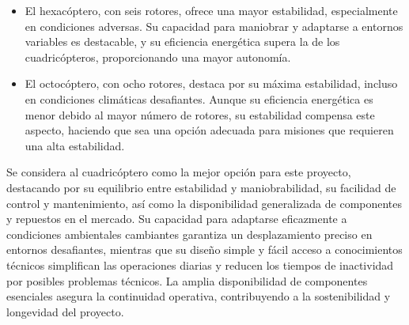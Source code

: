 \begin{itemize}
\begin{itemize}[label=o]
\item El hexacóptero, con seis rotores, ofrece una mayor estabilidad, especialmente en condiciones adversas. Su capacidad para maniobrar y adaptarse a entornos variables es destacable, y su eficiencia energética supera la de los cuadricópteros, proporcionando una mayor autonomía.
\item El octocóptero, con ocho rotores, destaca por su máxima estabilidad, incluso en condiciones climáticas desafiantes. Aunque su eficiencia energética es menor debido al mayor número de rotores, su estabilidad compensa este aspecto, haciendo que sea una opción adecuada para misiones que requieren una alta estabilidad.
\end{itemize}
Se considera al cuadricóptero como la mejor opción para este proyecto, destacando por su equilibrio entre estabilidad y maniobrabilidad, su facilidad de control y mantenimiento, así como la disponibilidad generalizada de componentes y repuestos en el mercado. Su capacidad para adaptarse eficazmente a condiciones ambientales cambiantes garantiza un desplazamiento preciso en entornos desafiantes, mientras que su diseño simple y fácil acceso a conocimientos técnicos simplifican las operaciones diarias y reducen los tiempos de inactividad por posibles problemas técnicos. La amplia disponibilidad de componentes esenciales asegura la continuidad operativa, contribuyendo a la sostenibilidad y longevidad del proyecto.


\end{itemize}
